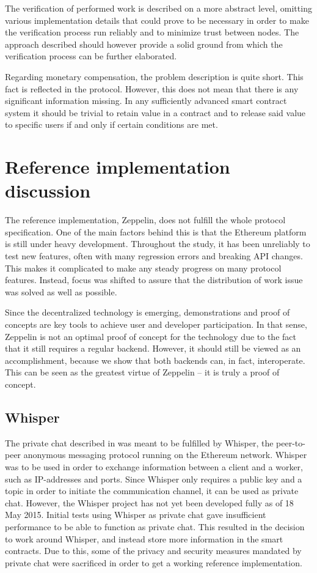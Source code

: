 The verification of performed work is described on a more abstract level, omitting various implementation details that could prove to be necessary in order to make the verification process run reliably and to minimize trust between nodes. The approach described should however provide a solid ground from which the verification process can be further elaborated.

Regarding monetary compensation, the problem description is quite short. This fact is reflected in the protocol. However, this does not mean that there is any significant information missing. In any sufficiently advanced smart contract system it should be trivial to retain value in a contract and to release said value to specific users if and only if certain conditions are met.

\section{Reference implementation discussion}
The reference implementation, Zeppelin, does not fulfill the whole protocol specification. One of the main factors behind this is that the Ethereum platform is still under heavy development. Throughout the study, it has been unreliably to test new features, often with many regression errors and breaking API changes. This makes it complicated to make any steady progress on many protocol features. Instead, focus was shifted to assure that the distribution of work issue was solved as well as possible.

Since the decentralized technology is emerging, demonstrations and proof of concepts are key tools to achieve user and developer participation. In that sense, Zeppelin is not an optimal proof of concept for the technology due to the fact that it still requires a regular backend. However, it should still be viewed as an accomplishment, because we show that both backends can, in fact, interoperate. This can be seen as the greatest virtue of Zeppelin -- it is truly a proof of concept.

\subsection{Whisper}
The private chat described in  was meant to be fulfilled by Whisper, the peer-to-peer anonymous messaging protocol running on the Ethereum network. Whisper was to be used in order to exchange information between a client and a worker, such as IP-addresses and ports. Since Whisper only requires a public key and a topic in order to initiate the communication channel, it can be used as private chat. However, the Whisper project has not yet been developed fully as of 18 May 2015. Initial tests using Whisper as private chat gave insufficient performance to be able to function as private chat. This resulted in the decision to work around Whisper, and instead store more information in the smart contracts. Due to this, some of the privacy and security measures mandated by private chat were sacrificed in order to get a working reference implementation.

